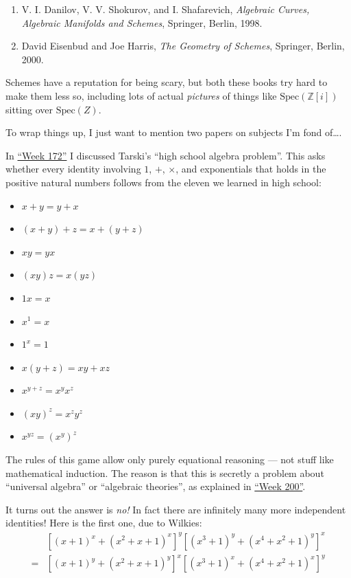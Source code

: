 \documentclass{article}
\def\tightlist{}
\begin{document}
\begin{enumerate}
\def\labelenumi{\arabic{enumi})}
\setcounter{enumi}{5}
\item
  V. I. Danilov, V. V. Shokurov, and I. Shafarevich, \emph{Algebraic
  Curves, Algebraic Manifolds and Schemes}, Springer, Berlin, 1998.
\item
  David Eisenbud and Joe Harris, \emph{The Geometry of Schemes},
  Springer, Berlin, 2000.
\end{enumerate}

Schemes have a reputation for being scary, but both these books try hard
to make them less so, including lots of actual \emph{pictures} of things
like \(\mathrm{Spec}(\mathbb{Z}[i])\) sitting over \(\mathrm{Spec}(Z)\).

To wrap things up, I just want to mention two papers on subjects I'm
fond of\ldots.

In \protect\hyperlink{week172}{``Week 172''} I discussed Tarski's ``high
school algebra problem''. This asks whether every identity involving
\(1\), \(+\), \(\times\), and exponentials that holds in the positive
natural numbers follows from the eleven we learned in high school:

\begin{itemize}
\tightlist
\item
  \(x + y = y + x\)
\item
  \((x + y) + z = x + (y + z)\)
\item
  \(xy = yx\)
\item
  \((xy)z = x(yz)\)
\item
  \(1x=x\)
\item
  \(x^1 = x\)
\item
  \(1^x = 1\)
\item
  \(x(y + z) = xy + xz\)
\item
  \(x^{y + z} = x^y x^z\)
\item
  \((xy)^z = x^z y^z\)
\item
  \(x^{yz} = (x^y)^z\)
\end{itemize}

The rules of this game allow only purely equational reasoning --- not
stuff like mathematical induction. The reason is that this is secretly a
problem about ``universal algebra'' or ``algebraic theories'', as
explained in \protect\hyperlink{week200}{``Week 200''}.

It turns out the answer is \emph{no!} In fact there are infinitely many
more independent identities! Here is the first one, due to Wilkies: \[
  \begin{aligned}
    &[(x + 1)^x + (x^2 + x + 1)^x]^y  [(x^3 + 1)^y + (x^4 + x^2 + 1)^y]^x
  \\= &[(x + 1)^y + (x^2 + x + 1)^y]^x  [(x^3 + 1)^x + (x^4 + x^2 + 1)^x]^y
  \end{aligned}
\]
\end{document}
